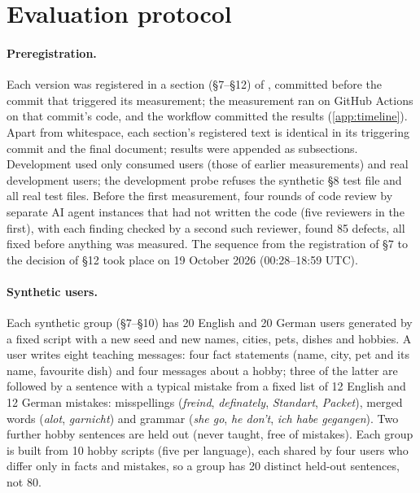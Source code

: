 \documentclass[10pt,twocolumn]{article}
\newcommand{\file}[1]{\path{#1}}%
\begin{document}
\section{Evaluation protocol}\label{sec:protocol}

\paragraph{Preregistration.} Each version was registered in a section (\S7--\S12) of \file{docs/PREREG_SELA2.md},
committed before the commit that triggered its measurement; the measurement ran on GitHub Actions on that commit's
code, and the workflow committed the results (\cref{app:timeline}). Apart from whitespace, each section's registered
text is identical in its triggering commit and the final document; results were appended as subsections. Development
used only consumed users (those of earlier measurements) and real development users; the development probe refuses the
synthetic \S8 test file and all real test files. Before the first measurement, four rounds of code review by separate
AI agent instances that had not written the code (five reviewers in the first), with each finding checked by a second
such reviewer, found 85 defects, all fixed before anything was measured. The sequence from the
registration of \S7 to the decision of \S12 took place on 19 October 2026 (00:28--18:59 UTC).

\paragraph{Synthetic users.} Each synthetic group (\S7--\S10) has 20 English and 20 German users generated by a fixed
script with a new seed and new names, cities, pets, dishes and hobbies. A user writes eight teaching messages: four fact
statements (name, city, pet and its name, favourite dish) and four messages about a hobby; three of the latter are
followed by a sentence with a typical mistake from a fixed list of 12 English and 12 German mistakes: misspellings
(\emph{freind}, \emph{definately}, \emph{Standart}, \emph{Packet}), merged words (\emph{alot}, \emph{garnicht}) and
grammar (\emph{she go}, \emph{he don't}, \emph{ich habe gegangen}). Two further hobby sentences are held out (never
taught, free of mistakes). Each group is built from 10 hobby scripts (five per language), each shared by four users
who differ only in facts and mistakes, so a group has 20 distinct held-out sentences, not 80.
\end{document}
